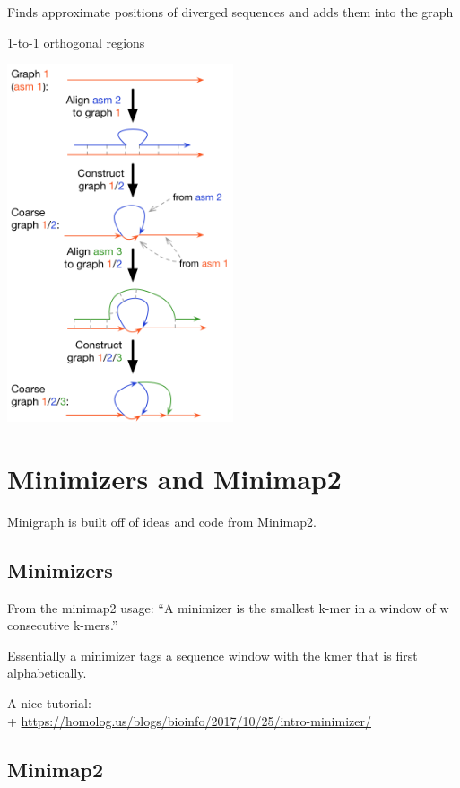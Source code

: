 \documentclass[
]{book}
\begin{document}
Finds approximate positions of diverged sequences and adds them into the graph

1-to-1 orthogonal regions

\includegraphics[width=0.5\textwidth,height=\textheight]{./Figures/Minigraph.png}

\hypertarget{minimizers-and-minimap2}{%
\section{Minimizers and Minimap2}\label{minimizers-and-minimap2}}

Minigraph is built off of ideas and code from Minimap2.

\hypertarget{minimizers}{%
\subsection*{Minimizers}\label{minimizers}}

From the minimap2 usage:
``A minimizer is the smallest k-mer in a window of w consecutive k-mers.''

Essentially a minimizer tags a sequence window with the kmer that is first alphabetically.

A nice tutorial:\\
+ \url{https://homolog.us/blogs/bioinfo/2017/10/25/intro-minimizer/}

\hypertarget{minimap2}{%
\subsection*{Minimap2}\label{minimap2}}
\end{document}
